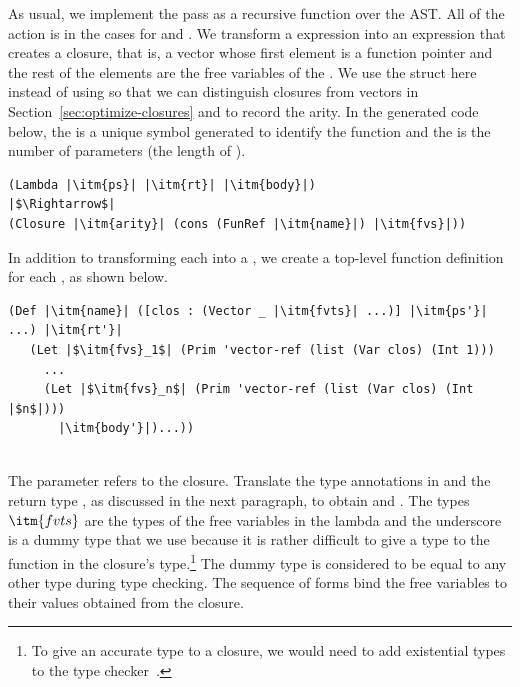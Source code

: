 \documentclass[7x10]{TimesAPriori_MIT}%
\begin{document}
As usual, we implement the pass as a recursive function over the
AST. All of the action is in the cases for  and
. We transform a  expression into an expression
that creates a closure, that is, a vector whose first element is a
function pointer and the rest of the elements are the free variables
of the . We use the struct  here instead of
using  so that we can distinguish closures from vectors
in Section~\ref{sec:optimize-closures} and to record the arity.  In
the generated code below, the  is a unique symbol generated
to identify the function and the  is the number of
parameters (the length of ).
\begin{lstlisting}
(Lambda |\itm{ps}| |\itm{rt}| |\itm{body}|)
|$\Rightarrow$|
(Closure |\itm{arity}| (cons (FunRef |\itm{name}|) |\itm{fvs}|))
\end{lstlisting}
In addition to transforming each  into a , we
create a top-level function definition for each , as
shown below.\\
\begin{minipage}{0.8\textwidth}
\begin{lstlisting}
(Def |\itm{name}| ([clos : (Vector _ |\itm{fvts}| ...)] |\itm{ps'}| ...) |\itm{rt'}|
   (Let |$\itm{fvs}_1$| (Prim 'vector-ref (list (Var clos) (Int 1)))
     ...
     (Let |$\itm{fvs}_n$| (Prim 'vector-ref (list (Var clos) (Int |$n$|)))
       |\itm{body'}|)...))
\end{lstlisting}
\end{minipage}\\
The  parameter refers to the closure.  Translate the type
annotations in  and the return type , as discussed in
the next paragraph, to obtain  and .  The types
$\itm{fvts}$ are the types of the free variables in the lambda and the
underscore \code{\_} is a dummy type that we use because it is rather
difficult to give a type to the function in the closure's
type.\footnote{To give an accurate type to a closure, we would need to
  add existential types to the type checker~\citep{Minamide:1996ys}.}
The dummy type is considered to be equal to any other type during type
checking.  The sequence of  forms bind the free variables to
their values obtained from the closure.
\end{document}
